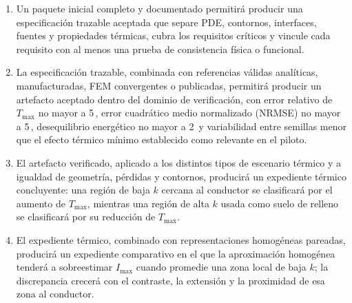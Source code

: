 \documentclass[11pt,a4paper,oneside]{report}
\newcommand{\Tmax}{T_{\max}}
\newcommand{\Imax}{I_{\max}}
\newcommand{\pct}{\mbox{\char37}}
\begin{document}
\begin{enumerate}[label=HE\arabic*.]
  \item Un paquete inicial completo y documentado permitirá producir una especificación trazable aceptada que separe PDE, contornos, interfaces, fuentes y propiedades térmicas, cubra los requisitos críticos y vincule cada requisito con al menos una prueba de consistencia física o funcional.
  \item La especificación trazable, combinada con referencias válidas analíticas, manufacturadas, FEM convergentes o publicadas, permitirá producir un artefacto aceptado dentro del dominio de verificación, con error relativo de $\Tmax$ no mayor a 5\,\pct{}, error cuadrático medio normalizado (NRMSE) no mayor a 5\,\pct{}, desequilibrio energético no mayor a 2\,\pct{} y variabilidad entre semillas menor que el efecto térmico mínimo establecido como relevante en el piloto.
  \item El artefacto verificado, aplicado a los distintos tipos de escenario térmico y a igualdad de geometría, pérdidas y contornos, producirá un expediente térmico concluyente: una región de baja $k$ cercana al conductor se clasificará por el aumento de $\Tmax$, mientras una región de alta $k$ usada como suelo de relleno se clasificará por su reducción de $\Tmax$.
  \item El expediente térmico, combinado con representaciones homogéneas pareadas, producirá un expediente comparativo en el que la aproximación homogénea tenderá a sobreestimar $\Imax$ cuando promedie una zona local de baja $k$; la discrepancia crecerá con el contraste, la extensión y la proximidad de esa zona al conductor.
\end{enumerate}
\end{document}
